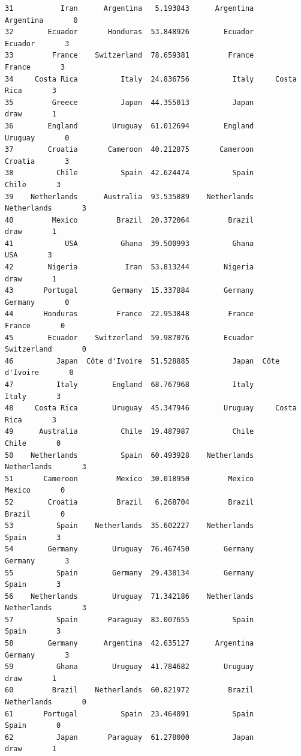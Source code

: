 \documentclass[12pt,fleqn]{article}\usepackage{../common}
\begin{document}
\begin{verbatim}
31           Iran      Argentina   5.193843      Argentina      Argentina       0
32        Ecuador       Honduras  53.848926        Ecuador        Ecuador       3
33         France    Switzerland  78.659381         France         France       3
34     Costa Rica          Italy  24.836756          Italy     Costa Rica       3
35         Greece          Japan  44.355013          Japan           draw       1
36        England        Uruguay  61.012694        England        Uruguay       0
37        Croatia       Cameroon  40.212875       Cameroon        Croatia       3
38          Chile          Spain  42.624474          Spain          Chile       3
39    Netherlands      Australia  93.535889    Netherlands    Netherlands       3
40         Mexico         Brazil  20.372064         Brazil           draw       1
41            USA          Ghana  39.500993          Ghana            USA       3
42        Nigeria           Iran  53.813244        Nigeria           draw       1
43       Portugal        Germany  15.337884        Germany        Germany       0
44       Honduras         France  22.953848         France         France       0
45        Ecuador    Switzerland  59.987076        Ecuador    Switzerland       0
46          Japan  Côte d'Ivoire  51.528885          Japan  Côte d'Ivoire       0
47          Italy        England  68.767968          Italy          Italy       3
48     Costa Rica        Uruguay  45.347946        Uruguay     Costa Rica       3
49      Australia          Chile  19.487987          Chile          Chile       0
50    Netherlands          Spain  60.493928    Netherlands    Netherlands       3
51       Cameroon         Mexico  30.018950         Mexico         Mexico       0
52        Croatia         Brazil   6.268704         Brazil         Brazil       0
53          Spain    Netherlands  35.602227    Netherlands          Spain       3
54        Germany        Uruguay  76.467450        Germany        Germany       3
55          Spain        Germany  29.438134        Germany          Spain       3
56    Netherlands        Uruguay  71.342186    Netherlands    Netherlands       3
57          Spain       Paraguay  83.007655          Spain          Spain       3
58        Germany      Argentina  42.635127      Argentina        Germany       3
59          Ghana        Uruguay  41.784682        Uruguay           draw       1
60         Brazil    Netherlands  60.821972         Brazil    Netherlands       0
61       Portugal          Spain  23.464891          Spain          Spain       0
62          Japan       Paraguay  61.278000          Japan           draw       1

\end{verbatim}
\end{document}
